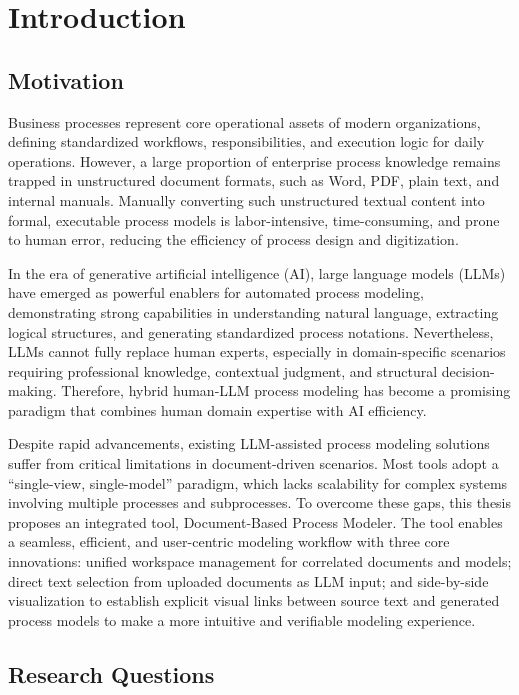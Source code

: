 \chapter{Introduction}
\label{sec:intro}

\section{Motivation}
\label{sec:intro:mo}

Business processes represent core operational assets of modern organizations, defining standardized workflows, responsibilities, and execution logic for daily operations. However, a large proportion of enterprise process knowledge remains trapped in unstructured document formats, such as Word, PDF, plain text, and internal manuals. Manually converting such unstructured textual content into formal, executable process models is labor-intensive, time-consuming, and prone to human error, reducing the efficiency of process design and digitization.

In the era of generative artificial intelligence (AI), large language models (LLMs) have emerged as powerful enablers for automated process modeling, demonstrating strong capabilities in understanding natural language, extracting logical structures, and generating standardized process notations. Nevertheless, LLMs cannot fully replace human experts, especially in domain-specific scenarios requiring professional knowledge, contextual judgment, and structural decision-making\cite{klievtsova2024process}. Therefore, hybrid human-LLM process modeling has become a promising paradigm that combines human domain expertise with AI efficiency. 

Despite rapid advancements, existing LLM-assisted process modeling solutions suffer from critical limitations in document-driven scenarios. Most tools adopt a “single-view, single-model” paradigm, which lacks scalability for complex systems involving multiple processes and subprocesses. To overcome these gaps, this thesis proposes an integrated tool, Document-Based Process Modeler. The tool enables a seamless, efficient, and user-centric modeling workflow with three core innovations: unified workspace management for correlated documents and models; direct text selection from uploaded documents as LLM input; and side-by-side visualization to establish explicit visual links between source text and generated process models to make a more intuitive and verifiable modeling experience.

\section{Research Questions}

